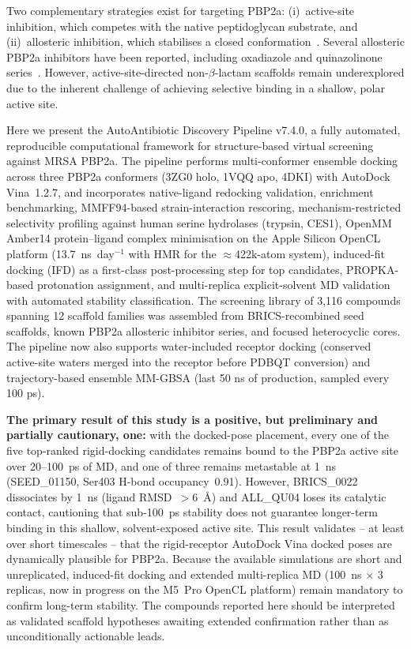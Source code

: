 \documentclass[12pt]{article}
\begin{document}
Two complementary strategies exist for targeting PBP2a: (i)~active-site inhibition, which competes with the native peptidoglycan substrate, and (ii)~allosteric inhibition, which stabilises a closed conformation~\cite{esimonet2021}. Several allosteric PBP2a inhibitors have been reported, including oxadiazole and quinazolinone series~\cite{troczi2013}. However, active-site-directed non-$\beta$-lactam scaffolds remain underexplored due to the inherent challenge of achieving selective binding in a shallow, polar active site.

Here we present the AutoAntibiotic Discovery Pipeline v7.4.0, a fully automated, reproducible computational framework for structure-based virtual screening against MRSA PBP2a. The pipeline performs multi-conformer ensemble docking across three PBP2a conformers (3ZG0 holo, 1VQQ apo, 4DKI) with AutoDock Vina~1.2.7, and incorporates native-ligand redocking validation, enrichment benchmarking, MMFF94-based strain-interaction rescoring, mechanism-restricted selectivity profiling against human serine hydrolases (trypsin, CES1), OpenMM Amber14 protein--ligand complex minimisation on the Apple Silicon OpenCL platform (13.7~ns~day$^{-1}$ with HMR for the $\approx$422k-atom system), induced-fit docking (IFD) as a first-class post-processing step for top candidates, PROPKA-based protonation assignment, and multi-replica explicit-solvent MD validation with automated stability classification. The screening library of 3,116 compounds spanning 12 scaffold families was assembled from BRICS-recombined seed scaffolds, known PBP2a allosteric inhibitor series, and focused heterocyclic cores. The pipeline now also supports water-included receptor docking (conserved active-site waters merged into the receptor before PDBQT conversion) and trajectory-based ensemble MM-GBSA (last 50 ns of production, sampled every 100 ps).

\noindent\textbf{The primary result of this study is a positive, but preliminary and partially cautionary, one:} with the docked-pose placement, every one of the five top-ranked rigid-docking candidates remains bound to the PBP2a active site over 20--100~ps of MD, and one of three remains metastable at 1~ns (SEED\_01150, Ser403 H-bond occupancy~0.91). However, BRICS\_0022 dissociates by 1~ns (ligand RMSD~$>$6~\si{\angstrom}) and ALL\_QU04 loses its catalytic contact, cautioning that sub-100~ps stability does not guarantee longer-term binding in this shallow, solvent-exposed active site. This result validates -- at least over short timescales -- that the rigid-receptor AutoDock Vina docked poses are dynamically plausible for PBP2a. Because the available simulations are short and unreplicated, induced-fit docking and extended multi-replica MD (100~ns $\times$ 3 replicas, now in progress on the M5~Pro OpenCL platform) remain mandatory to confirm long-term stability. The compounds reported here should be interpreted as validated scaffold hypotheses awaiting extended confirmation rather than as unconditionally actionable leads.
\end{document}

